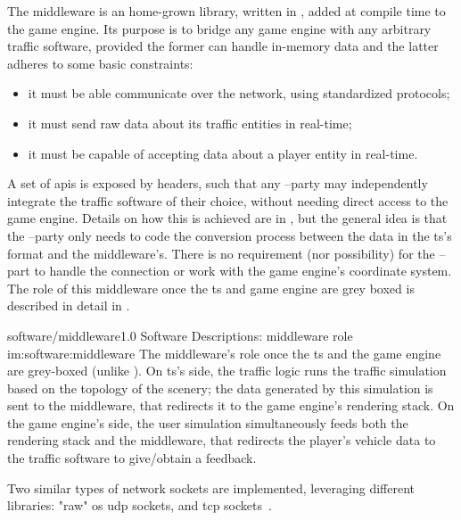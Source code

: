 The middleware is an home-grown library, written in , added at compile time to the game engine. Its purpose is to bridge any game engine with any arbitrary traffic software, provided the former can handle in-memory data and the latter adheres to some basic constraints:

\begin{itemize}
	\item it must be able communicate over the network, using standardized protocols;
	\item it must send raw data about its traffic entities in real-time;
	\item it must be capable of accepting data about a player entity in real-time.
\end{itemize}

A set of \glspl{api} is exposed by  headers, such that any --party may independently integrate the traffic software of their choice, without needing direct access to the game engine. Details on how this is achieved are in , but the general idea is that the --party only needs to code the conversion process between the data in the \gls{ts}'s format and the \gls{middleware}'s. There is no requirement (nor possibility) for the --part to handle the connection or work with the game engine's coordinate system. The role of this \gls{middleware} once the \gls{ts} and game engine are grey boxed is described in detail in .

\begin{image}
	{software/middleware}{1.0}
	{Software Descriptions: \gls{middleware} role}
	{im:software:middleware}
	{}
	{The \gls{middleware}'s role once the \gls{ts} and the game engine are grey-boxed (unlike ). On \gls{ts}'s side, the traffic logic runs the traffic simulation based on the topology of the scenery; the data generated by this simulation is sent to the \gls{middleware}, that redirects it to the game engine's rendering stack. On the game engine's side, the user simulation simultaneously feeds both the rendering stack and the middleware, that redirects the player's vehicle data to the traffic software to give/obtain a feedback.}
\end{image}

Two similar types of network sockets are implemented, leveraging different libraries: "raw" \gls{os} \gls{udp} sockets, and  \gls{tcp} sockets~\cite{software:zmq}.

